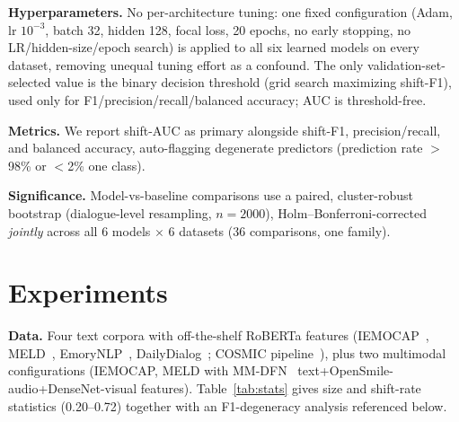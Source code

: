 \documentclass[conference]{IEEEtran}
\begin{document}
\textbf{Hyperparameters.} No per-architecture tuning: one fixed configuration (Adam, lr $10^{-3}$,
batch 32, hidden 128, focal loss, 20 epochs, no early stopping, no LR/hidden-size/epoch search) is
applied to all six learned models on every dataset, removing unequal tuning effort as a confound.
The only validation-set-selected value is the binary decision threshold (grid search maximizing
shift-F1), used only for F1/precision/recall/balanced accuracy; AUC is threshold-free.

\textbf{Metrics.} We report shift-AUC as primary alongside shift-F1, precision/recall, and balanced
accuracy, auto-flagging degenerate predictors (prediction rate $>$98\% or $<$2\% one class).

\textbf{Significance.} Model-vs-baseline comparisons use a paired, cluster-robust bootstrap
(dialogue-level resampling, $n{=}2000$), Holm--Bonferroni-corrected \emph{jointly} across all 6
models $\times$ 6 datasets (36 comparisons, one family).

\section{Experiments}
\label{sec:exp}

\textbf{Data.} Four text corpora with off-the-shelf RoBERTa features
(IEMOCAP~\cite{busso2008iemocap}, MELD~\cite{poria2019meld}, EmoryNLP~\cite{zahiri2018emorynlp},
DailyDialog~\cite{li2017dailydialog}; COSMIC pipeline~\cite{ghosal2020cosmic}), plus two multimodal
configurations (IEMOCAP, MELD with MM-DFN~\cite{hu2021mmdfn}
text+OpenSmile-audio+DenseNet-visual features). Table~\ref{tab:stats} gives size and shift-rate
statistics (0.20--0.72) together with an F1-degeneracy analysis referenced below.

\begin{table}[t]
\centering
\footnotesize
\caption{Dataset statistics and F1 degeneracy. Always-shift F1 $=2r/(1{+}r)$ for shift rate $r$
(analytic; always-shift balanced accuracy is 0.500 by construction, omitted). Transition-BA
$\approx$0.50 on MELD/EmoryNLP/IEMOCAP-mm shows standard F1 sits at the degenerate ceiling on
exactly the corpora where shift is common; only IEMOCAP and DailyDialog clear it.}
\label{tab:stats}
\end{table}
\end{document}

